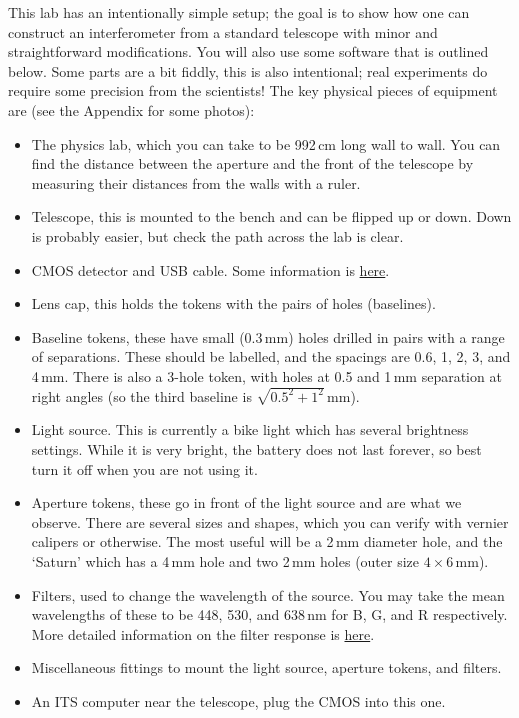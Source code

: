 \documentclass[11pt]{article}
\begin{document}
This lab has an intentionally simple setup; the goal is to show how one can construct an interferometer from a standard telescope with minor and straightforward modifications. You will also use some software that is outlined below. Some parts are a bit fiddly, this is also intentional; real experiments do require some precision from the scientists! The key physical pieces of equipment are (see the Appendix for some photos):
\begin{itemize}
    \item The physics lab, which you can take to be 992\,cm long wall to wall. You can find the distance between the aperture and the front of the telescope by measuring their distances from the walls with a ruler.
    \item Telescope, this is mounted to the bench and can be flipped up or down. Down is probably easier, but check the path across the lab is clear.
    \item CMOS detector and USB cable. Some information is \href{https://www.qhyccd.com/qhy5l-ii-planetary-guiding-camera/}{here}.
    \item Lens cap, this holds the tokens with the pairs of holes (baselines).
    \item Baseline tokens, these have small (0.3\,mm) holes drilled in pairs with a range of separations. These should be labelled, and the spacings are 0.6, 1, 2, 3, and 4\,mm. There is also a 3-hole token, with holes at 0.5 and 1\,mm separation at right angles (so the third baseline is $\sqrt{0.5^2 + 1^2}$\,mm).
    \item Light source. This is currently a bike light which has several brightness settings. While it is very bright, the battery does not last forever, so best turn it off when you are not using it.
    \item Aperture tokens, these go in front of the light source and are what we observe. There are several sizes and shapes, which you can verify with vernier calipers or otherwise. The most useful will be a 2\,mm diameter hole, and the `Saturn' which has a 4\,mm hole and two 2\,mm holes (outer size $4 \times 6$\,mm).
    \item Filters, used to change the wavelength of the source. You may take the mean wavelengths of these to be 448, 530, and 638\,nm for B, G, and R respectively. More detailed information on the filter response is \href{https://www.firstlightoptics.com/rgb-filters-filter-sets/zwo-2-lrgb-filter-set.html}{here}.
    \item Miscellaneous fittings to mount the light source, aperture tokens, and filters.
    \item An ITS computer near the telescope, plug the CMOS into this one.
\end{itemize}
\end{document}
